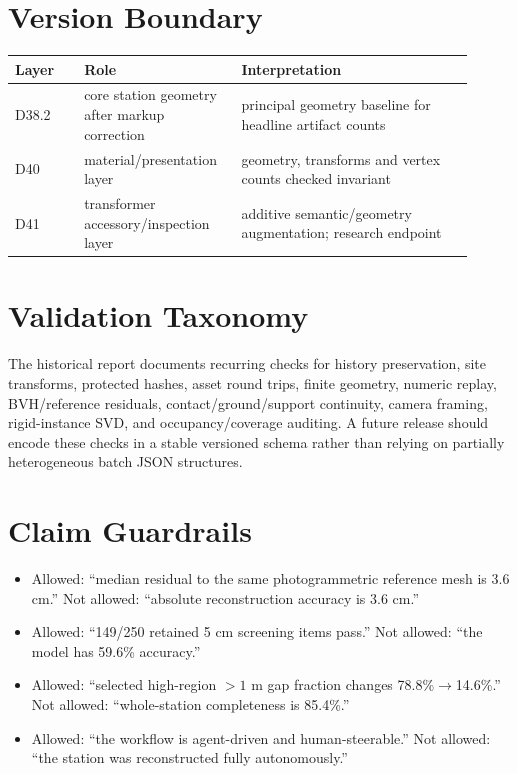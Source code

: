 \documentclass[10pt]{article}
\begin{document}
\appendix
\section{Version Boundary}
\begin{tabular}{p{0.14\linewidth}p{0.3\linewidth}p{0.47\linewidth}}
\toprule
Layer & Role & Interpretation \\
\midrule
D38.2 & core station geometry after markup correction & principal geometry baseline for headline artifact counts \\
D40 & material/presentation layer & geometry, transforms and vertex counts checked invariant \\
D41 & transformer accessory/inspection layer & additive semantic/geometry augmentation; research endpoint \\
\bottomrule
\end{tabular}

\section{Validation Taxonomy}
The historical report documents recurring checks for history preservation, site transforms, protected hashes, asset round trips, finite geometry, numeric replay, BVH/reference residuals, contact/ground/support continuity, camera framing, rigid-instance SVD, and occupancy/coverage auditing. A future release should encode these checks in a stable versioned schema rather than relying on partially heterogeneous batch JSON structures.

\section{Claim Guardrails}
\begin{itemize}
\item Allowed: ``median residual to the same photogrammetric reference mesh is 3.6 cm.'' Not allowed: ``absolute reconstruction accuracy is 3.6 cm.''
\item Allowed: ``149/250 retained 5 cm screening items pass.'' Not allowed: ``the model has 59.6\% accuracy.''
\item Allowed: ``selected high-region $>1$ m gap fraction changes 78.8\%$\rightarrow$14.6\%.'' Not allowed: ``whole-station completeness is 85.4\%.''
\item Allowed: ``the workflow is agent-driven and human-steerable.'' Not allowed: ``the station was reconstructed fully autonomously.''
\end{itemize}



\end{document}
